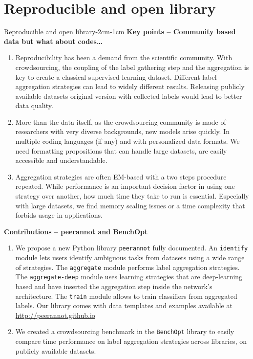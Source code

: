 \chapter{Reproducible and open library}
\label{chap:peerannot}
\enlargethispage{3\baselineskip}

\begin{keypointstwomargins}{Reproducible and open library}{-2cm}{-1cm}
        \textbf{Key points -- Community based data but what about codes\dots}
        \begin{enumerate}[leftmargin=*]
        \item Reproducibility has been a demand from the scientific community. With crowdsourcing, the coupling of the label gathering step and the aggregation is key to create a classical supervised learning dataset. Different label aggregation strategies can lead to widely different results. Releasing publicly available datasets original version with collected labels would lead to better data quality.
        \item More than the data itself, as the crowdsourcing community is made of researchers with very diverse backgrounds, new models arise quickly. In multiple coding languages (if any) and with personalized data formats. We need formatting propositions that can handle large datasets, are easily accessible and understandable.
        \item Aggregation strategies are often EM-based with a two steps procedure repeated. While performance is an important decision factor in using one strategy over another, how much time they take to run is essential. Especially with large datasets, we find memory scaling issues or a time complexity that forbids usage in applications.
        \end{enumerate}

        \textbf{Contributions -- peerannot and BenchOpt}
        \begin{enumerate}[leftmargin=*,start=4]
        \item We propose a new Python library \texttt{peerannot} fully documented. An \texttt{identify} module lets users identify ambiguous tasks from datasets using a wide range of strategies. The \texttt{aggregate} module performs label aggregation strategies. The \texttt{aggregate-deep} module uses learning strategies that are deep-learning based and have inserted the aggregation step inside the network's architecture. The \texttt{train} module allows to train classifiers from aggregated labels. Our library comes with data templates and examples available at \url{http://peerannot.github.io}
        \item We created a crowdsourcing benchmark in the \texttt{BenchOpt} library to easily compare time performance on label aggregation strategies across libraries, on publicly available datasets.
        \end{enumerate}
\end{keypointstwomargins}

